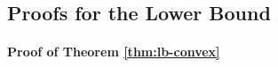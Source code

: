 \subsection{Proofs for the Lower Bound}
\label{sec:lb-proof}
\paragraph{Proof of Theorem \ref{thm:lb-convex}}


